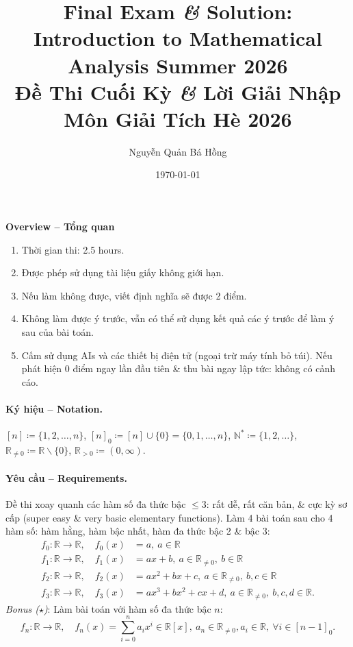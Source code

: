 \documentclass{article}
\author{Nguyễn Quản Bá Hồng}
\title{Final Exam {\it\&} Solution: Introduction to Mathematical Analysis Summer 2026\\Đề Thi Cuối Kỳ {\it\&} Lời Giải Nhập Môn Giải Tích Hè 2026}
\date{\today}
\begin{document}
\maketitle
\begin{center}
	\textbf{\textsf{Overview -- Tổng quan}}
\end{center}

\begin{enumerate}
	\item Thời gian thi: 2.5 hours.
	\item Được phép sử dụng tài liệu giấy không giới hạn.
	\item Nếu làm không được, viết định nghĩa sẽ được 2 điểm.
	\item Không làm được ý trước, vẫn có thể sử dụng kết quả các ý trước để làm ý sau của bài toán.
	\item Cấm sử dụng AIs và các thiết bị điện tử (ngoại trừ máy tính bỏ túi). Nếu phát hiện 0 điểm ngay lần đầu tiên \& thu bài ngay lập tức: không có cảnh cáo.
\end{enumerate}

\paragraph{Ký hiệu -- Notation.} $[n]\coloneqq\{1,2,\ldots,n\}$, $[n]_0\coloneqq[n]\cup\{0\} = \{0,1,\ldots,n\}$, $\mathbb{N}^*\coloneqq\{1,2,\ldots\}$, $\mathbb{R}_{\ne0}\coloneqq\mathbb{R}\backslash\{0\}$, $\mathbb{R}_{> 0}\coloneqq(0,\infty)$.

\paragraph{Yêu cầu -- Requirements.} Đề thi xoay quanh các hàm số đa thức bậc $\le3$: rất dễ, rất căn bản, \& cực kỳ sơ cấp (super easy \& very basic elementary functions). Làm 4 bài toán sau cho 4 hàm số: hàm hằng, hàm bậc nhất, hàm đa thức bậc 2 \& bậc 3:
\begin{align*}
	f_0:\mathbb{R}\to\mathbb{R},\quad f_0(x) &= a,\ a\in\mathbb{R}\\
	f_1:\mathbb{R}\to\mathbb{R},\quad f_1(x) &= ax + b,\ a\in\mathbb{R}_{\ne0},\ b\in\mathbb{R}\\
	f_2:\mathbb{R}\to\mathbb{R},\quad f_2(x) &= ax^2 + bx + c,\ a\in\mathbb{R}_{\ne0},\ b,c\in\mathbb{R}\\
	f_3:\mathbb{R}\to\mathbb{R},\quad f_3(x) &= ax^3 + bx^2 + cx + d,\ a\in\mathbb{R}_{\ne0},\ b,c,d\in\mathbb{R}.
\end{align*}
\textit{Bonus ($\star$)}: Làm bài toán với hàm số đa thức bậc $n$:
\begin{equation*}
	f_n:\mathbb{R}\to\mathbb{R},\quad f_n(x) = \sum_{i = 0}^n a_ix^i\in\mathbb{R}[x],\ a_n\in\mathbb{R}_{\ne0},a_i\in\mathbb{R},\ \forall i\in[n - 1]_0.
\end{equation*}
\end{document}

